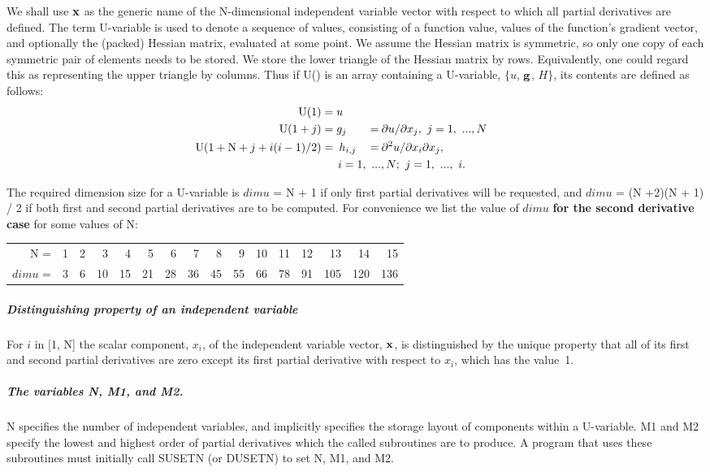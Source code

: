 \documentclass[twoside]{MATH77}
\begin{document}
We shall use ${\bf x}$ as the generic name of the N-dimensional independent
variable vector with respect to which all partial derivatives are defined.
The term U-variable is used to denote a sequence of values, consisting of a
function value, values of the function's gradient vector, and optionally the
(packed) Hessian matrix, evaluated at some point. We assume the Hessian
matrix is symmetric, so only one copy of each symmetric pair of elements
needs to be stored. We store the lower triangle of the Hessian matrix by
rows. Equivalently, one could regard this as representing the upper triangle
by columns. Thus if U() is an array containing a U-variable, $\{u$, ${\bf
g}$, $H\}$, its contents are defined as follows:
\begin{alignat*}{2}
\text{U}(1) &=u\\
\text{U}(1+j) &= g_j &= &\:\partial u/\partial x_j,\ j = 1,\ ...,N\\
\hspace{-15pt}\text{U}(1+\text{N}+j+i(i-1)/2)&=\: h_{i,j}\: &= &\:
\partial ^2u/\partial x_i\partial x_j,\\
&&&\hspace{-.5in}i = 1,\ ..., N;\ j = 1,\ ...,\ i.
\end{alignat*}

The required dimension size for a U-variable is $dimu$ = N + 1 if only first
partial derivatives will be requested, and $dimu$ = (N +2)(N + 1) / 2 if both
first and second partial derivatives are to be computed. For convenience we
list the value of $dimu$ {\bf for the second derivative case} for some values
of N:

\begin{tabular}{@{}r*{15}{@{\ }r}}
N = & 1 & 2 & 3 & 4 & 5 & 6 & 7 & 8 & 9 & 10 & 11 & 12 & 13 & 14 & 15\\
$dimu$ = & 3 & 6 & 10 & 15 & 21 & 28 & 36 & 45 & 55 & 66 & 78 & 91 & 105 &
120 & 136
\end{tabular}

\subparagraph{Distinguishing property of an independent variable}

For $i$ in [1, N] the scalar component, $x_i$, of the independent variable
vector, ${\bf x}$, is distinguished by the unique property that all of its first
and second partial derivatives are zero except its first partial derivative
with respect to $x_i$, which has the value~1.

\subparagraph{The variables N, M1, and M2.}

N specifies the number of independent
variables, and implicitly specifies the storage layout of components within
a U-variable.  M1 and M2 specify the lowest and highest order of partial
derivatives which the called subroutines are to produce.  A program that
uses these subroutines must initially call SUSETN (or DUSETN)
to set N, M1, and M2.
\end{document}
